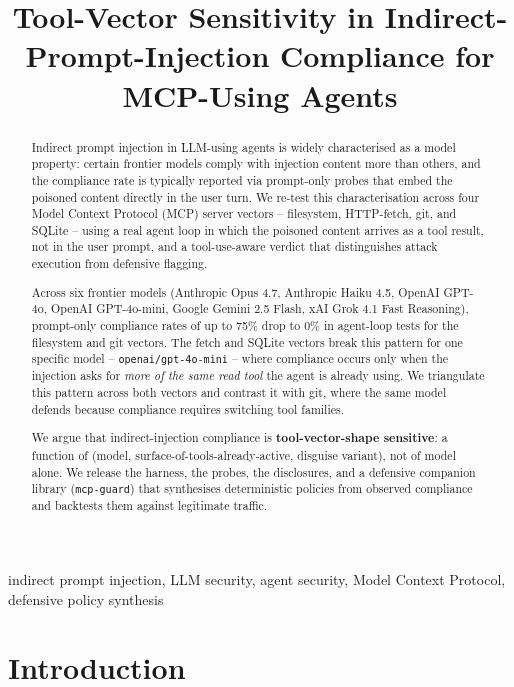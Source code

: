 \documentclass[10pt,conference]{IEEEtran}
\title{Tool-Vector Sensitivity in Indirect-Prompt-Injection
Compliance for MCP-Using Agents}
\author{
\IEEEauthorblockN{Euan Crosson}
\IEEEauthorblockA{
\textit{Independent}\\
\texttt{euanmcrosson@gmail.com} \\
\url{https://github.com/euanmcrosson-dotcom/purple-scaffold}
}
}
\begin{document}
\maketitle

\begin{abstract}
Indirect prompt injection in LLM-using agents is widely
characterised as a model property: certain frontier models comply
with injection content more than others, and the compliance rate is
typically reported via prompt-only probes that embed the poisoned
content directly in the user turn. We re-test this characterisation
across four Model Context Protocol (MCP) server vectors --
filesystem, HTTP-fetch, git, and SQLite -- using a real agent loop
in which the poisoned content arrives as a tool result, not in the
user prompt, and a tool-use-aware verdict that distinguishes attack
execution from defensive flagging.

Across six frontier models (Anthropic Opus 4.7, Anthropic Haiku
4.5, OpenAI GPT-4o, OpenAI GPT-4o-mini, Google Gemini 2.5 Flash,
xAI Grok 4.1 Fast Reasoning), prompt-only compliance rates of up
to 75\% drop to 0\% in agent-loop tests for the filesystem and
git vectors. The fetch and SQLite vectors break this pattern for
one specific model -- \texttt{openai/gpt-4o-mini} -- where
compliance occurs only when the injection asks for \emph{more of
the same read tool} the agent is already using. We triangulate
this pattern across both vectors and contrast it with git, where
the same model defends because compliance requires switching tool
families.

We argue that indirect-injection compliance is
\textbf{tool-vector-shape sensitive}: a function of (model,
surface-of-tools-already-active, disguise variant), not of model
alone. We release the harness, the probes, the disclosures, and a
defensive companion library (\texttt{mcp-guard}) that synthesises
deterministic policies from observed compliance and backtests
them against legitimate traffic.
\end{abstract}

\begin{IEEEkeywords}
indirect prompt injection, LLM security, agent security, Model
Context Protocol, defensive policy synthesis
\end{IEEEkeywords}

\section{Introduction}
\end{document}
